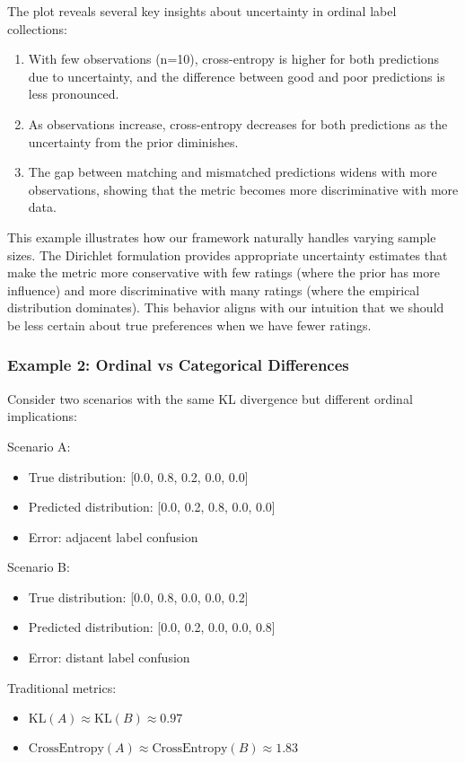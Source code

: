 \documentclass[journal]{IEEEtran}
\begin{document}
The plot reveals several key insights about uncertainty in ordinal label collections:

\begin{enumerate}
\item With few observations (n=10), cross-entropy is higher for both predictions due to uncertainty, and the difference between good and poor predictions is less pronounced.
\item As observations increase, cross-entropy decreases for both predictions as the uncertainty from the prior diminishes.
\item The gap between matching and mismatched predictions widens with more observations, showing that the metric becomes more discriminative with more data.
\end{enumerate}

This example illustrates how our framework naturally handles varying sample sizes. The Dirichlet formulation provides appropriate uncertainty estimates that make the metric more conservative with few ratings (where the prior has more influence) and more discriminative with many ratings (where the empirical distribution dominates). This behavior aligns with our intuition that we should be less certain about true preferences when we have fewer ratings.


\subsubsection{Example 2: Ordinal vs Categorical Differences}
Consider two scenarios with the same KL divergence but different ordinal implications:

Scenario A:
\begin{itemize}
\item True distribution: [0.0, 0.8, 0.2, 0.0, 0.0]
\item Predicted distribution: [0.0, 0.2, 0.8, 0.0, 0.0]
\item Error: adjacent label confusion
\end{itemize}

Scenario B:
\begin{itemize}
\item True distribution: [0.0, 0.8, 0.0, 0.0, 0.2]
\item Predicted distribution: [0.0, 0.2, 0.0, 0.0, 0.8]
\item Error: distant label confusion
\end{itemize}

Traditional metrics:
\begin{itemize}
\item $\text{KL}(A) \approx \text{KL}(B) \approx 0.97$
\item $\text{CrossEntropy}(A) \approx \text{CrossEntropy}(B) \approx 1.83$
\end{itemize}
\end{document}
